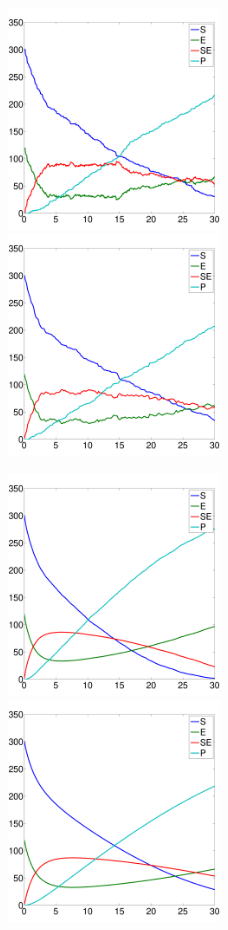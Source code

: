 \documentclass[ugrad,lot,lof,openright,11pt,oneside,onehalfspace]{RUthesis}
\begin{document}
		\begin{figure}[H]
		\centerline{
			\includegraphics[width=0.5\textwidth]{figures/MM_ssa.pdf}
			\includegraphics[width=0.5\textwidth]{figures/MM_tau.pdf}
			}
		\centerline{
			\includegraphics[width=0.5\textwidth]{figures/MM_cle.pdf}
			\includegraphics[width=0.5\textwidth]{figures/MM_rre.pdf}
}
\end{figure}
\end{document}
